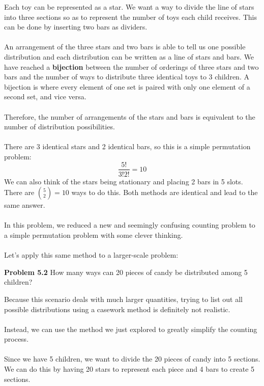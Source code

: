 \documentclass[11pt]{scrartcl}
\begin{document}
Each toy can be represented as a star. We want a way to divide the line of stars into three sections so as to represent the number of toys each child receives. This can be done by inserting two bars as dividers. \\
\\
\noindent 
An arrangement of the three stars and two bars is able to tell us one possible distribution and each distribution can be written as a line of stars and bars. We have reached a \textbf{bijection} between the number of orderings of three stars and two bars and the number of ways to distribute three identical toys to 3 children. A bijection is where every element of one set is paired with only one element of a second set, and vice versa. \\
\\
\noindent 
Therefore, the number of arrangements of the stars and bars is equivalent to the number of distribution possibilities. \\
\\
\noindent 
There are 3 identical stars and 2 identical bars, so this is a simple permutation problem: 
$$\frac{5!}{3!2!}=10$$ 
\noindent 
We can also think of the stars being stationary and placing 2 bars in 5 slots. There are ${5 \choose 2}=10$ ways to do this. Both methods are identical and lead to the same answer. \\
\\
\noindent
In this problem, we reduced a new and seemingly confusing counting problem to a simple permutation problem with some clever thinking. \\
\\
\noindent
Let's apply this same method to a larger-scale problem:
\\
\begin{tcolorbox}
\textbf{Problem 5.2} How many ways can 20 pieces of candy be distributed among 5 children?
\end{tcolorbox}
\noindent 
Because this scenario deals with much larger quantities, trying to list out all possible distributions using a casework method is definitely not realistic.  \\
\\
\noindent 
Instead, we can use the method we just explored to greatly simplify the counting process. \\
\\
\noindent 
Since we have 5 children, we want to divide the 20 pieces of candy into 5 sections. We can do this by having 20 stars to represent each piece and 4 bars to create 5 sections. \\
\end{document}
